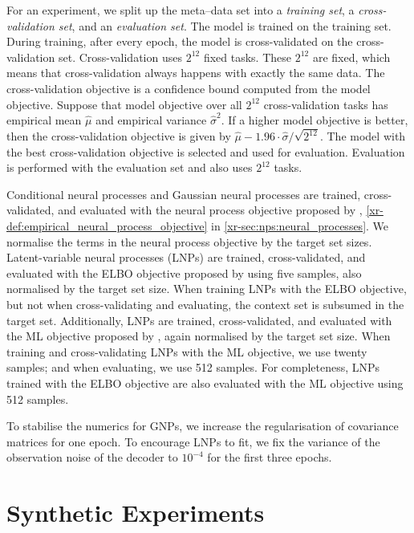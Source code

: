 \documentclass[12pt]{report}
\newcommand{\xrprefix}[1]{xr-#1}
\begin{document}
For an experiment, we split up the meta--data set into a \emph{training set}, a \emph{cross-validation set}, and an \emph{evaluation set}.
The model is trained on the training set.
During training, after every epoch, the model is cross-validated on the cross-validation set.
Cross-validation uses $2^{12}$ fixed tasks.
These $2^{12}$ are fixed, which means that cross-validation always happens with exactly the same data.
The cross-validation objective is a confidence bound computed from the model objective.
Suppose that model objective over all $2^{12}$ cross-validation tasks has empirical mean $\hat\mu$ and empirical variance $\hat\sigma^2$.
If a higher model objective is better, then the cross-validation objective is given by $\hat\mu - 1.96 \cdot \hat\sigma / \sqrt{2^{12}}$.
The model with the best cross-validation objective is selected and used for evaluation.
Evaluation is performed with the evaluation set and also uses $2^{12}$ tasks.

Conditional neural processes and Gaussian neural processes are trained, cross-validated, and evaluated with the neural process objective proposed by \textcite{Garnelo:2018:Conditional_Neural_Processes}, \eqref{\xrprefix{def:empirical_neural_process_objective}} in \cref{\xrprefix{sec:nps:neural_processes}}.
We normalise the terms in the neural process objective by the target set sizes.
Latent-variable neural processes (LNPs) are trained, cross-validated, and evaluated with the ELBO objective proposed by \textcite{Garnelo:2018:Neural_Processes} using five samples, also normalised by the target set size.
When training LNPs with the ELBO objective, but not when cross-validating and evaluating, the context set is subsumed in the target set.
Additionally, LNPs are trained, cross-validated, and evaluated with the ML objective proposed by \textcite{Foong:2020:Meta-Learning_Stationary_Stochastic_Process_Prediction}, again normalised by the target set size.
When training and cross-validating LNPs with the ML objective, we use twenty samples;
and when evaluating, we use 512 samples.
For completeness, LNPs trained with the ELBO objective are also evaluated with the ML objective using 512 samples.

To stabilise the numerics for GNPs, we increase the regularisation of covariance matrices for one epoch.
To encourage LNPs to fit, we fix the variance of the observation noise of the decoder to $10^{-4}$ for the first three epochs.

\section{Synthetic Experiments}
\label{sec:experimental_details:synthetic}
\end{document}
